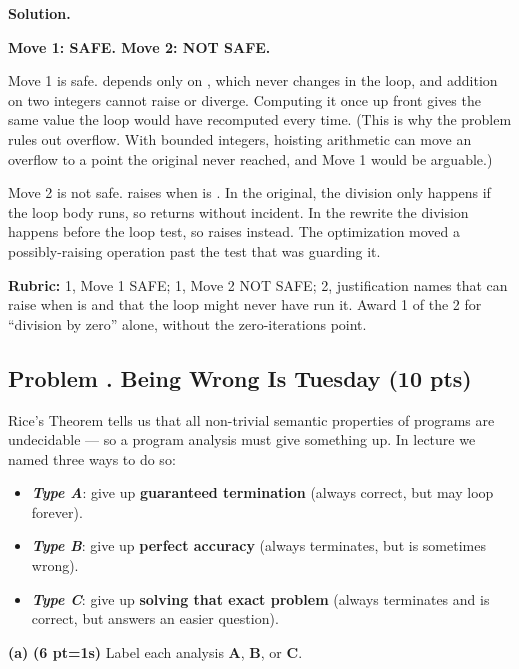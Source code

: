\documentclass[crop=false]{standalone}
\newif\ifsol
\newenvironment{solution}
    {\par\color{solution_color}\begin{framed}\textbf{Solution.}\par}
    {\end{framed}}
\newcommand{\term}[1]{\textbf{\textit{#1}}}
\newcommand{\quizproblem}[3]{%
  \needspace{5\baselineskip}%
  \stepcounter{problem}%
  \ifsol
    \subsection*{Problem \arabic{problem}. #1 \hfill \timing{#2} \quad (#3 pts)}%
  \else
    \subsection*{Problem \arabic{problem}. #1 \hfill (#3 pts)}%
  \fi
}
\newcommand{\subpts}[1]{\textbf{(#1 pt\ifnum#1=1\else s\fi)}}
\begin{document}
\begin{solution}
\textbf{Move 1: SAFE. Move 2: NOT SAFE.}

Move 1 is safe.  depends only on , which never
changes in the loop, and addition on two integers cannot raise or
diverge. Computing it once up front gives the same value the loop would
have recomputed every time. (This is why the problem rules out overflow.
With bounded integers, hoisting arithmetic can move an overflow to a
point the original never reached, and Move 1 would be arguable.)

Move 2 is not safe.  raises when  is .
In the original, the division only happens if the loop body runs, so
 returns  without incident. In the rewrite the
division happens before the loop test, so  raises instead.
The optimization moved a possibly-raising operation past the test that
was guarding it.

\textbf{Rubric:} 1, Move 1 SAFE; 1, Move 2 NOT SAFE; 2, justification
names that  can raise when  is  and that the
loop might never have run it. Award 1 of the 2 for ``division by zero''
alone, without the zero-iterations point.
\end{solution}


\quizproblem{Being Wrong Is Tuesday}{8}{10}

Rice's Theorem tells us that all non-trivial semantic properties of
programs are undecidable --- so a program analysis must give something
up. In lecture we named three ways to do so:

\begin{itemize}
  \item \term{Type A}: give up \textbf{guaranteed termination} (always
    correct, but may loop forever).
  \item \term{Type B}: give up \textbf{perfect accuracy} (always
    terminates, but is sometimes wrong).
  \item \term{Type C}: give up \textbf{solving that exact problem}
    (always terminates and is correct, but answers an easier question).
\end{itemize}

\textbf{(a)} \subpts{6} Label each analysis \textbf{A}, \textbf{B}, or
\textbf{C}.
\end{document}
